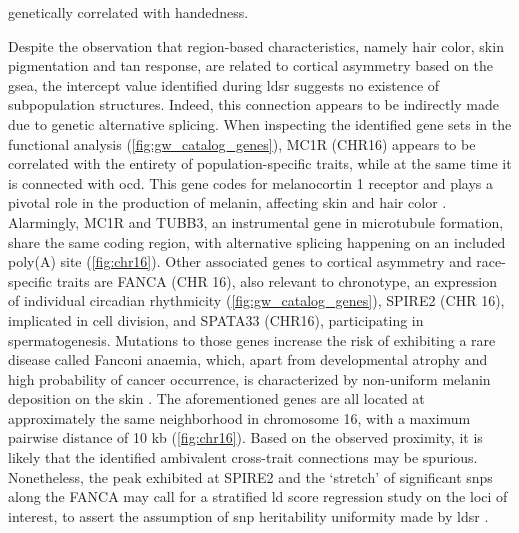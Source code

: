 genetically correlated with handedness.

Despite the observation that region-based characteristics, namely hair color, skin pigmentation and tan response, are related to cortical asymmetry based on the \ac{gsea}, the intercept value identified during \ac{ldsr} suggests no existence of subpopulation structures. Indeed, this connection appears to be indirectly made due to genetic alternative splicing. When inspecting the identified gene sets in the functional analysis (\autoref{fig:gw_catalog_genes}), MC1R (CHR16) appears to be correlated with the entirety of population-specific traits, while at the same time it is connected with \ac{ocd}. This gene codes for melanocortin 1 receptor and plays a pivotal role in the production of melanin, affecting skin and hair color \cite{Swope2018}. Alarmingly, MC1R and TUBB3, an instrumental gene in microtubule formation, share the same coding region, with alternative splicing happening on an included poly(A) site \cite{Dalziel2011}(\autoref{fig:chr16}). Other associated genes to cortical asymmetry and race-specific traits are FANCA (CHR 16), also relevant to chronotype, an expression of individual circadian rhythmicity \cite{Takahashi2018} (\autoref{fig:gw_catalog_genes}), SPIRE2 (CHR 16), implicated in cell division, and SPATA33 (CHR16), participating in spermatogenesis. Mutations to those genes increase the risk of exhibiting a rare disease called Fanconi anaemia, which, apart from developmental atrophy and high probability of cancer occurrence, is characterized by non-uniform melanin deposition on the skin \cite{Visconti2018}. The aforementioned genes are all located at approximately the same neighborhood in chromosome 16, with a maximum pairwise distance of 10 kb (\autoref{fig:chr16}). Based on the observed proximity, it is likely that the identified ambivalent cross-trait connections may be spurious. Nonetheless, the peak exhibited at SPIRE2 and the `stretch' of significant \acp{snp} along the FANCA may call for a stratified \ac{ld} score regression study on the loci of interest, to assert the assumption of \ac{snp} heritability uniformity made by \ac{ldsr} \cite{Finucane2015}.



